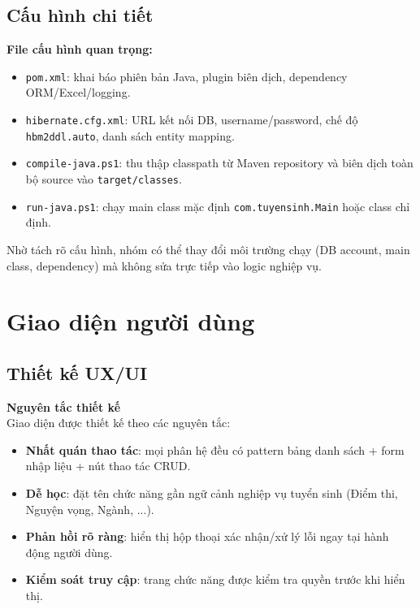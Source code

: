 \documentclass[12pt,a4paper,oneside]{report}
\begin{document}
\section{Cấu hình chi tiết}
\textbf{File cấu hình quan trọng:}
\begin{itemize}
  \item \texttt{pom.xml}: khai báo phiên bản Java, plugin biên dịch, dependency ORM/Excel/logging.
  \item \texttt{hibernate.cfg.xml}: URL kết nối DB, username/password, chế độ \texttt{hbm2ddl.auto}, danh sách entity mapping.
  \item \texttt{compile-java.ps1}: thu thập classpath từ Maven repository và biên dịch toàn bộ source vào \texttt{target/classes}.
  \item \texttt{run-java.ps1}: chạy main class mặc định \texttt{com.tuyensinh.Main} hoặc class chỉ định.
\end{itemize}

Nhờ tách rõ cấu hình, nhóm có thể thay đổi môi trường chạy (DB account, main class, dependency) mà không sửa trực tiếp vào logic nghiệp vụ.

\chapter{Giao diện người dùng}
\section{Thiết kế UX/UI}
\textbf{Nguyên tắc thiết kế\\}
Giao diện được thiết kế theo các nguyên tắc:
\begin{itemize}
  \item \textbf{Nhất quán thao tác}: mọi phân hệ đều có pattern bảng danh sách + form nhập liệu + nút thao tác CRUD.
  \item \textbf{Dễ học}: đặt tên chức năng gần ngữ cảnh nghiệp vụ tuyển sinh (Điểm thi, Nguyện vọng, Ngành, ...).
  \item \textbf{Phản hồi rõ ràng}: hiển thị hộp thoại xác nhận/xử lý lỗi ngay tại hành động người dùng.
  \item \textbf{Kiểm soát truy cập}: trang chức năng được kiểm tra quyền trước khi hiển thị.
\end{itemize}
\end{document}
